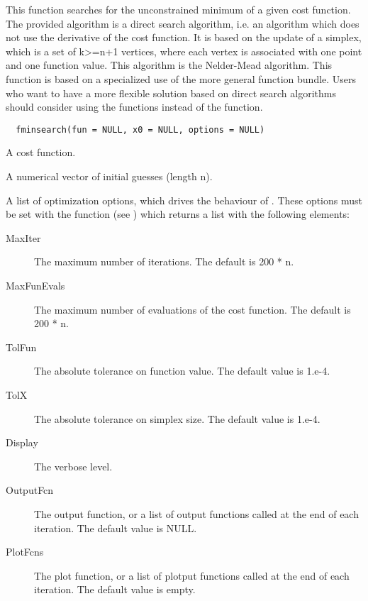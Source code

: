 %
\begin{Description}\relax
This function searches for the unconstrained minimum of a given cost function.
The provided algorithm is a direct search algorithm, i.e. an algorithm which
does not use the derivative of the cost function. It is based on the update of
a simplex, which is a set of k>=n+1 vertices, where each vertex is associated
with one point and one function value. This algorithm is the Nelder-Mead
algorithm. This function is based on a specialized use of the more general
 function bundle. Users who want to have a more flexible
solution based on direct search algorithms should consider using the
 functions instead of the  function.
\end{Description}
%
\begin{Usage}
\begin{verbatim}
  fminsearch(fun = NULL, x0 = NULL, options = NULL)
\end{verbatim}
\end{Usage}
%
\begin{Arguments}
\begin{ldescription}
\item[\code{fun}] A cost function.
\item[\code{x0}] A numerical vector of initial guesses (length n).
\item[\code{options}] A list of optimization options, which drives the behaviour of
. These options must be set with the 
function (see ) which returns a list with the following
elements: \begin{description}

\item[MaxIter] The maximum number of iterations. The default is 200 * n.
\item[MaxFunEvals] The maximum number of evaluations of the cost function.
The default is 200 * n.
\item[TolFun] The absolute tolerance on function value. The default value
is 1.e-4.
\item[TolX] The absolute tolerance on simplex size. The default value is
1.e-4.
\item[Display] The verbose level.
\item[OutputFcn] The output function, or a list of output functions
called at the end of each iteration. The default value is NULL.
\item[PlotFcns] The plot function, or a list of plotput functions called
at the end of each iteration. The default value is empty.

\end{description}


\end{ldescription}
\end{Arguments}
